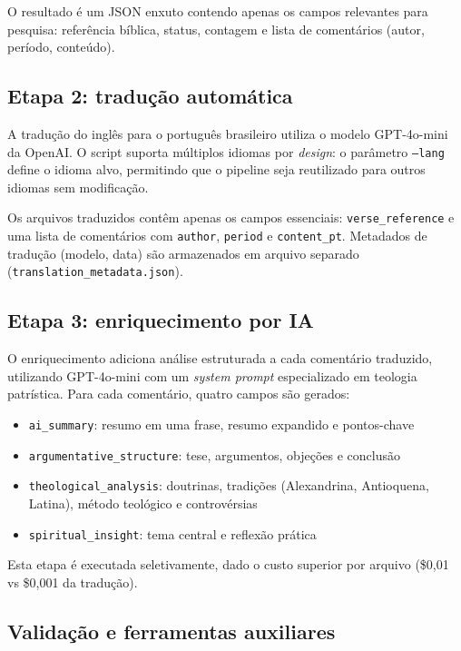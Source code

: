 \documentclass[11pt,a4paper]{article}
\begin{document}
O resultado \'{e} um JSON enxuto contendo apenas os campos relevantes para pesquisa: refer\^{e}ncia b\'{i}blica, status, contagem e lista de coment\'{a}rios (autor, per\'{i}odo, conte\'{u}do).

\subsection{Etapa 2: tradu\c{c}\~{a}o autom\'{a}tica}

A tradu\c{c}\~{a}o do ingl\^{e}s para o portugu\^{e}s brasileiro utiliza o modelo GPT-4o-mini da OpenAI. O script suporta m\'{u}ltiplos idiomas por \textit{design}: o par\^{a}metro \texttt{--lang} define o idioma alvo, permitindo que o pipeline seja reutilizado para outros idiomas sem modifica\c{c}\~{a}o.

Os arquivos traduzidos cont\^{e}m apenas os campos essenciais: \texttt{verse\_reference} e uma lista de coment\'{a}rios com \texttt{author}, \texttt{period} e \texttt{content\_pt}. Metadados de tradu\c{c}\~{a}o (modelo, data) s\~{a}o armazenados em arquivo separado (\texttt{translation\_metadata.json}).

\subsection{Etapa 3: enriquecimento por IA}

O enriquecimento adiciona an\'{a}lise estruturada a cada coment\'{a}rio traduzido, utilizando GPT-4o-mini com um \textit{system prompt} especializado em teologia patr\'{i}stica. Para cada coment\'{a}rio, quatro campos s\~{a}o gerados:

\begin{itemize}[leftmargin=1.25cm]
\item \texttt{ai\_summary}: resumo em uma frase, resumo expandido e pontos-chave
\item \texttt{argumentative\_structure}: tese, argumentos, obje\c{c}\~{o}es e conclus\~{a}o
\item \texttt{theological\_analysis}: doutrinas, tradi\c{c}\~{o}es (Alexandrina, Antioquena, Latina), m\'{e}todo teol\'{o}gico e controv\'{e}rsias
\item \texttt{spiritual\_insight}: tema central e reflex\~{a}o pr\'{a}tica
\end{itemize}

Esta etapa \'{e} executada seletivamente, dado o custo superior por arquivo (\$0,01 vs \$0,001 da tradu\c{c}\~{a}o).

\subsection{Valida\c{c}\~{a}o e ferramentas auxiliares}
\end{document}
